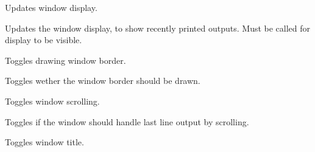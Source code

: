 \documentclass[letterpaper,10pt,english]{sphinxmanual}
\begin{document}
\begin{fulllineitems}
\begin{fulllineitems}
\end{fulllineitems}


\begin{fulllineitems}
\label{\detokenize{index:_CPPv2N7ostendo6Window6UpdateEv}}%
\pysigstartmultiline
{}\label{\detokenize{index:Pessumclassostendo_1_1Window_1a31f6220b282ed1bf705a0d95d52cd051}}%
\pysigstopmultiline
Updates window display. 

Updates the window display, to show recently printed outputs. Must be called for display to be visible. 

\end{fulllineitems}


\begin{fulllineitems}
\label{\detokenize{index:_CPPv2N7ostendo6Window12ToggleBorderEv}}%
\pysigstartmultiline
{}\label{\detokenize{index:Pessumclassostendo_1_1Window_1a0f4f6327f9f42fa76c08d18d97059d7c}}%
\pysigstopmultiline
Toggles drawing window border. 

Toggles wether the window border should be drawn. 

\end{fulllineitems}


\begin{fulllineitems}
\label{\detokenize{index:_CPPv2N7ostendo6Window12ToggleScrollEv}}%
\pysigstartmultiline
{}\label{\detokenize{index:Pessumclassostendo_1_1Window_1ac02e38f9ad5b08a18f3bcc7b70a0944e}}%
\pysigstopmultiline
Toggles window scrolling. 

Toggles if the window should handle last line output by scrolling. 

\end{fulllineitems}


\begin{fulllineitems}
\label{\detokenize{index:_CPPv2N7ostendo6Window11ToggleTitleENSt6stringE}}%
\pysigstartmultiline
{}\label{\detokenize{index:Pessumclassostendo_1_1Window_1a7772b7589637c6ddebd87697c47aefc3}}%
\pysigstopmultiline
Toggles window title. 


\end{fulllineitems}
\end{fulllineitems}
\end{document}

